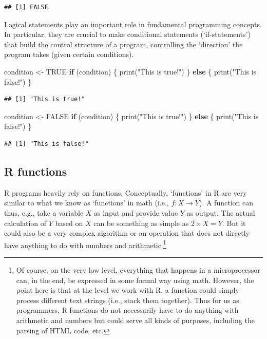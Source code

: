 \documentclass[
  12pt,
]{style/krantz}
\newenvironment{Shaded}{\begin{snugshade}}{\end{snugshade}}
\newcommand{\ConstantTok}[1]{\textcolor[rgb]{0.00,0.00,0.00}{#1}}
\newcommand{\ControlFlowTok}[1]{\textcolor[rgb]{0.13,0.29,0.53}{\textbf{#1}}}
\newcommand{\FunctionTok}[1]{\textcolor[rgb]{0.00,0.00,0.00}{#1}}
\newcommand{\NormalTok}[1]{#1}
\newcommand{\OtherTok}[1]{\textcolor[rgb]{0.56,0.35,0.01}{#1}}
\newcommand{\StringTok}[1]{\textcolor[rgb]{0.31,0.60,0.02}{#1}}
\begin{document}
\begin{verbatim}
## [1] FALSE
\end{verbatim}

Logical statements play an important role in fundamental programming concepts. In particular, they are crucial to make conditional statements (`if-statements') that build the control structure of a program, controlling the `direction' the program takes (given certain conditions).

\begin{Shaded}
\begin{Highlighting}[]
\NormalTok{condition }\OtherTok{\textless{}{-}} \ConstantTok{TRUE}
\ControlFlowTok{if}\NormalTok{ (condition) \{}
     \FunctionTok{print}\NormalTok{(}\StringTok{"This is true!"}\NormalTok{)}
\NormalTok{\} }\ControlFlowTok{else}\NormalTok{ \{}
     \FunctionTok{print}\NormalTok{(}\StringTok{"This is false!"}\NormalTok{)}
\NormalTok{\}}
\end{Highlighting}
\end{Shaded}

\begin{verbatim}
## [1] "This is true!"
\end{verbatim}

\begin{Shaded}
\begin{Highlighting}[]
\NormalTok{condition }\OtherTok{\textless{}{-}} \ConstantTok{FALSE}
\ControlFlowTok{if}\NormalTok{ (condition) \{}
     \FunctionTok{print}\NormalTok{(}\StringTok{"This is true!"}\NormalTok{)}
\NormalTok{\} }\ControlFlowTok{else}\NormalTok{ \{}
     \FunctionTok{print}\NormalTok{(}\StringTok{"This is false!"}\NormalTok{)}
\NormalTok{\}}
\end{Highlighting}
\end{Shaded}

\begin{verbatim}
## [1] "This is false!"
\end{verbatim}

\hypertarget{r-functions}{%
\subsection{R functions}\label{r-functions}}

R programs heavily rely on functions. Conceptually, `functions' in R are very similar to what we know as `functions' in math (i.e., \(f:X \rightarrow Y\)). A function can thus, e.g., take a variable \(X\) as input and provide value \(Y\) as output. The actual calculation of \(Y\) based on \(X\) can be something as simple as \(2\times X = Y\). But it could also be a very complex algorithm or an operation that does not directly have anything to do with numbers and arithmetic.\footnote{Of course, on the very low level, everything that happens in a microprocessor can, in the end, be expressed in some formal way using math. However, the point here is that at the level we work with R, a function could simply process different text strings (i.e., stack them together). Thus for us as programmers, R functions do not necessarily have to do anything with arithmetic and numbers but could serve all kinds of purposes, including the parsing of HTML code, etc.}
\end{document}
